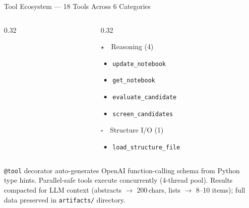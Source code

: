 \documentclass[aspectratio=169, 11pt]{beamer}
\newcommand{\faBrain}{\ensuremath{\star}}
\newcommand{\faCubes}{\ensuremath{\square}}
\begin{document}
\begin{frame}{Tool Ecosystem --- 18 Tools Across 6 Categories}
\begin{columns}[T]
\begin{column}{0.32\textwidth}
\end{column}
\begin{column}{0.32\textwidth}

\begin{block}{\faBrain\ \ Reasoning (4)}
\begin{itemize}\scriptsize
\setlength\itemsep{0pt}
\item \texttt{update\_notebook}
\item \texttt{get\_notebook}
\item \texttt{evaluate\_candidate}
\item \texttt{screen\_candidates}
\end{itemize}
\end{block}

\begin{block}{\faCubes\ \ Structure I/O (1)}
\begin{itemize}\scriptsize
\setlength\itemsep{0pt}
\item \texttt{load\_structure\_file}
\end{itemize}
\end{block}

\end{column}
\end{columns}

\vspace{2pt}
\begin{center}
\colorbox{lightblue!50}{\parbox{0.92\textwidth}{\centering
\scriptsize \texttt{@tool} decorator auto-generates OpenAI function-calling schema from Python type hints.
Parallel-safe tools execute concurrently (4-thread pool). Results compacted for LLM context (abstracts $\rightarrow$ 200\,chars, lists $\rightarrow$ 8--10 items); full data preserved in \texttt{artifacts/} directory.
}}
\end{center}
\end{frame}
\end{document}
